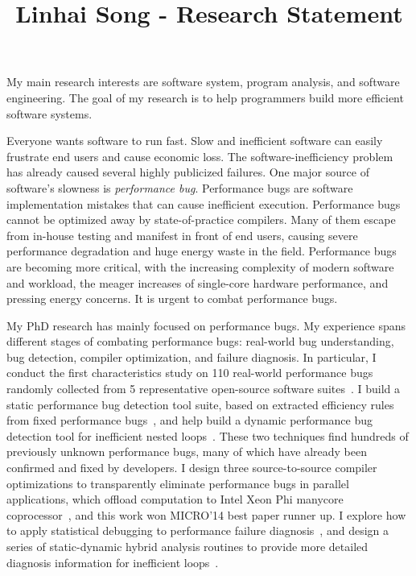\documentclass[10pt]{article}
\title{\vspace{-.7in}\bf{Linhai Song - Research Statement\vspace{-.4in}}}
\date{}
\begin{document}
\maketitle\vspace{-.2in}

My main research interests are software system, program analysis, and software engineering. 
The goal of my research is to help programmers build more efficient software systems.

Everyone wants software to run fast. 
Slow and inefficient software can easily frustrate end users and cause economic loss. 
The software-inefficiency problem has already caused several highly publicized failures. 
One major source of software’s slowness is \textit{performance bug}. 
Performance bugs are software implementation mistakes that can cause inefficient execution. 
Performance bugs cannot be optimized away by state-of-practice compilers. 
Many of them escape from in-house testing and manifest in front of end users, causing severe performance degradation and huge energy waste in the field. 
Performance bugs are becoming more critical, with the increasing complexity of modern software and workload, 
the meager increases of single-core hardware performance, 
and pressing energy concerns. 
It is urgent to combat performance bugs.

My PhD research has mainly focused on performance bugs. 
My experience spans different
stages of combating performance bugs: real-world bug understanding, bug detection,
compiler optimization, and failure diagnosis.
In particular, I conduct the first characteristics study on 110 real-world performance bugs 
randomly collected from 5 representative open-source software suites~\cite{jin12perfbug}.
I build a static performance bug detection tool suite, based on extracted efficiency rules from fixed performance bugs~\cite{jin12perfbug}, 
and help build a dynamic performance bug detection tool for inefficient nested loops~\cite{Nistor13ICSE}. 
These two techniques find hundreds of previously unknown performance bugs, many of which have already been confirmed and fixed by developers. 
I design three source-to-source compiler optimizations to transparently eliminate performance bugs in 
parallel applications, which offload computation to Intel Xeon Phi manycore coprocessor~\cite{Song14MICRO}, 
and this work won MICRO'14 best paper runner up. 
I explore how to apply statistical debugging to performance failure diagnosis~\cite{Song14OOPSLA}, 
and design a series of static-dynamic hybrid analysis routines to provide more detailed diagnosis information for inefficient loops~\cite{Song16PLDI}.    
\end{document}
